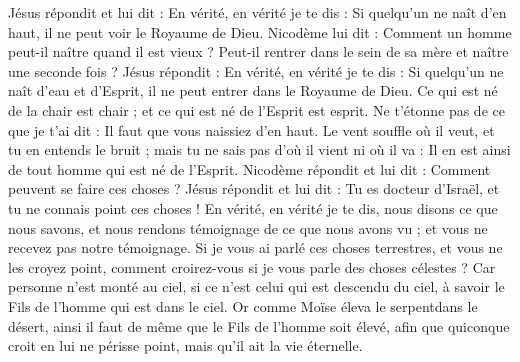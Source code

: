 \begin{multicols}{2}
Jésus répondit et lui dit : En vérité, en vérité je te dis : Si quelqu'un ne naît d'en haut, il ne peut voir le Royaume de Dieu.
Nicodème lui dit : Comment un homme peut-il naître quand il est vieux ? Peut-il rentrer dans le sein de sa mère et naître une seconde fois ?
Jésus répondit : En vérité, en vérité je te dis : Si quelqu'un ne naît d'eau et d'Esprit, il ne peut entrer dans le Royaume de Dieu.
Ce qui est né de la chair est chair ; et ce qui est né de l'Esprit est esprit.
Ne t'étonne pas de ce que je t'ai dit : Il faut que vous naissiez d'en haut.
Le vent souffle où il veut, et tu en entends le bruit ; mais tu ne sais pas d'où il vient ni où il va : Il en est ainsi de tout homme qui est né de l'Esprit.
Nicodème répondit et lui dit : Comment peuvent se faire ces choses ?
Jésus répondit et lui dit : Tu es docteur d'Israël, et tu ne connais point ces choses !
En vérité, en vérité je te dis, nous disons ce que nous savons, et nous rendons témoignage de ce que nous avons vu ; et vous ne recevez pas notre témoignage.
Si je vous ai parlé ces choses terrestres, et vous ne les croyez point, comment croirez-vous si je vous parle des choses célestes ?
Car personne n'est monté au ciel, si ce n'est celui qui est descendu du ciel, à savoir le Fils de l'homme qui est dans le ciel.
Or comme Moïse éleva le serpentdans le désert, ainsi il faut de même que le Fils de l'homme soit élevé,
afin que quiconque croit en lui ne périsse point, mais qu'il ait la vie éternelle.

\end{multicols}
